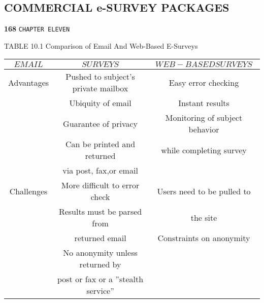\documentclass[a4,9pt]{beamer}
\begin{document}
\begin{frame}
\section*{COMMERCIAL e-SURVEY PACKAGES}
\begin{flushleft}
\textbf{168}\hspace*{1cm} \texttt{CHAPTER ELEVEN}
\end{flushleft}

\vspace*{0.5cm}
\begin{flushleft}
TABLE 10.1 Comparison of Email And Web-Based E-Surveys
\begin{tabular}{ccc}

 \hline

 \hline

 \hline

 \hline

 $EMAIL$ &  $SURVEYS$ & $WEB-BASED SURVEYS$\\
\hline
Advantages  &  Pushed to subject's private mailbox  &  Easy error checking \\
            &  Ubiquity of email                    &  Instant results \\
            &  Guarantee of privacy                 &  Monitoring of subject behavior \\
            &  Can be printed and returned          &  \hspace*{0.2cm} while completing survey\\
            &  \hspace*{0.2cm} via post, fax,or email&                                       \\
  \vspace*{0.2cm}
Challenges  &  More difficult to error check        &  Users need to be pulled to\\
            &  Results must be parsed from          &  \hspace*{0.2cm} the site \\
            &  \hspace*{0.2cm} returned email       &  Constraints on anonymity \\
            &  No anonymity unless returned by      &                           \\
            &  \hspace*{0.2cm} post or fax or a ''stealth service'' &           \\
 \hline

 \hline

 \hline

 \hline
\end{tabular}
\end{flushleft}

\vspace*{0.5cm}
\end{frame}
\end{document}
